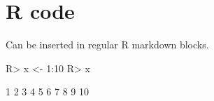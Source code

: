 \documentclass[jss]{jss}
\begin{document}
\hypertarget{r-code}{%
\section{R code}\label{r-code}}

Can be inserted in regular R markdown blocks.

\begin{CodeChunk}

\begin{CodeInput}
R> x <- 1:10
R> x
\end{CodeInput}

\begin{CodeOutput}
 [1]  1  2  3  4  5  6  7  8  9 10
\end{CodeOutput}
\end{CodeChunk}


\end{document}
